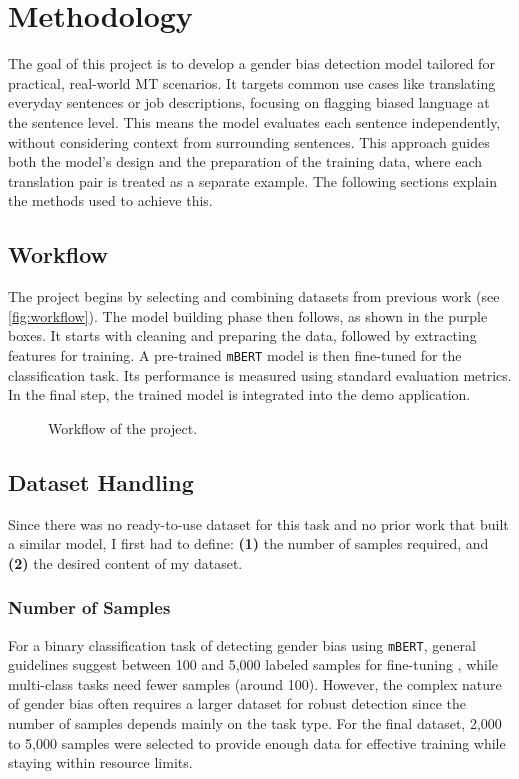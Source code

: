 \chapter{Methodology}
The goal of this project is to develop a gender bias detection model tailored for practical, real-world MT scenarios. It targets common use cases like translating everyday sentences or job descriptions, focusing on flagging biased language at the sentence level. This means the model evaluates each sentence independently, without considering context from surrounding sentences. This approach guides both the model’s design and the preparation of the training data, where each translation pair is treated as a separate example. The following sections explain the methods used to achieve this.

\section{Workflow}
The project begins by selecting and combining datasets from previous work (see \autoref{fig:workflow}). The model building phase then follows, as shown in the purple boxes. It starts with cleaning and preparing the data, followed by extracting features for training. A pre-trained \texttt{mBERT} model is then fine-tuned for the classification task. Its performance is measured using standard evaluation metrics. In the final step, the trained model is integrated  into the demo application.

\vspace{1cm} 
\begin{figure}[htb]
    \centering
    \scalebox{0.8}{}
    \caption{Workflow of the project.}
    \label{fig:workflow}
\end{figure}
\vspace{1cm} 

\section{Dataset Handling}

Since there was no ready-to-use dataset for this task and no prior work that built a similar model, I first had to define: \textbf{(1)} the number of samples required,  and \textbf{(2)} the desired content of my dataset.

\subsection{Number of Samples}
For a binary classification task of detecting gender bias using \texttt{mBERT}, general guidelines suggest between 100 and 5,000 labeled samples for fine-tuning \parencite{pecherComparingSpecialisedSmall2024}, while multi-class tasks need fewer samples (around 100). However, the complex nature of gender bias often requires a larger dataset for robust detection since the number of samples depends mainly on the task type. For the final dataset, 2,000 to 5,000 samples were selected to provide enough data for effective training while staying within resource limits.

